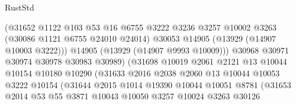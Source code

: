\begin{lexlean}{RustStd}
\begin{coremodule}
                                    (@31652
                                      @1122
                                      @103
                                      @53
                                      @16
                                      @6755
                                      @3222
                                      @3236
                                      @3257
                                      @10002
                                      @3263
                                      (@30086 @1121 @6755 @24010 @24014)
                                      @30053
                                      @14905
                                      (@13929 (@14907 @10003 @3222)))
                                    @14905
                                    (@13929 (@14907 @9993 @10009)))
                                  @30968
                                  @30971
                                  @30974
                                  @30978
                                  @30983
                                  @30989)
                                (@31698
                                  @10019
                                  @2061
                                  @2121
                                  @13
                                  @10044
                                  @10154
                                  @10180
                                  @10290
                                  (@31633
                                    @2016
                                    @2038
                                    @2060
                                    @13
                                    @10044
                                    @10053
                                    @3222
                                    @10154
                                    (@31644
                                      @2015
                                      @1014
                                      @19390
                                      @10044
                                      @10051
                                      @8781
                                      (@31653
                                        @2014
                                        @53
                                        @55
                                        @3871
                                        @10043
                                        @10050
                                        @3257
                                        @10024
                                        @3263
                                        @30126

\end{coremodule}
\end{lexlean}
